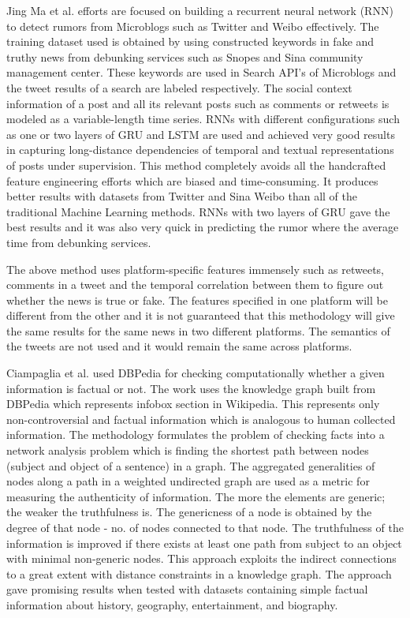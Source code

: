 \documentclass[a4paper, 11pt]{article}
\begin{document}
Jing Ma et al.\cite{Ma} efforts are focused on building a recurrent neural network (RNN) to detect rumors from Microblogs such as Twitter and Weibo effectively. The training dataset used is obtained by using constructed keywords in fake and truthy news from debunking services such as Snopes and Sina community management center. These keywords are used in Search API's of Microblogs and the tweet results of a search are labeled respectively. The social context information of a post and all its relevant posts such as comments or retweets is modeled as a variable-length time series. RNNs with different configurations such as one or two layers of GRU and LSTM are used and achieved very good results in capturing long-distance dependencies of temporal and textual representations of posts under supervision. This method completely avoids all the handcrafted feature engineering efforts which are biased and time-consuming. It produces better results with datasets from Twitter and Sina Weibo than all of the traditional Machine Learning methods. RNNs with two layers of GRU gave the best results and it was also very quick in predicting the rumor where the average time from debunking services.

The above method uses platform-specific features immensely such as retweets, comments in a tweet and the temporal correlation between them to figure out whether the news is true or fake. The features specified in one platform will be different from the other and it is not guaranteed that this methodology will give the same results for the same news in two different platforms. The semantics of the tweets are not used and it would remain the same across platforms. 

Ciampaglia et al. \cite{Ciampaglia2015} used DBPedia for checking computationally whether a given information is factual or not. The work uses the knowledge graph built from DBPedia which represents infobox section in Wikipedia. This represents only non-controversial and factual information which is analogous to human collected information. The methodology formulates the problem of checking facts into a network analysis problem which is finding the shortest path between nodes (subject and object of a sentence) in a graph. The aggregated generalities of nodes along a path in a weighted undirected graph are used as a metric for measuring the authenticity of information. The more the elements are generic; the weaker the truthfulness is.  The genericness of a node is obtained by the degree of that node - no. of nodes connected to that node. The truthfulness of the information is improved if there exists at least one path from subject to an object with minimal non-generic nodes. This approach exploits the indirect connections to a great extent with distance constraints in a knowledge graph. The approach gave promising results when tested with datasets containing simple factual information about history, geography, entertainment, and biography. 
\end{document}
